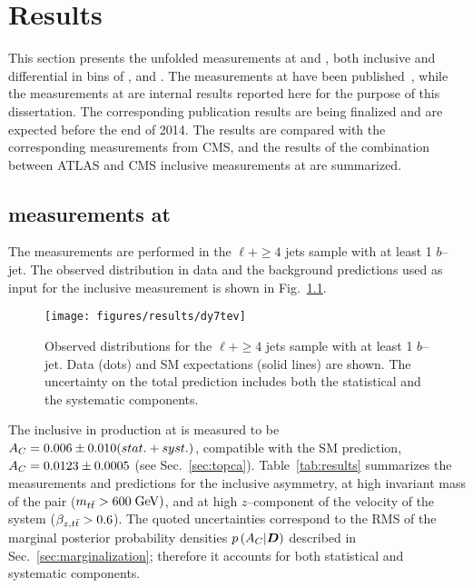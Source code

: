 \chapter{Results}
\label{sec:results}

This section presents the unfolded \ac{} measurements at \seventev{}
and \eighttev{}, both inclusive and differential in bins of \mtt{},
\pttt{} and \ytt{}. The measurements at \seventev{} have been
published~\cite{Aad:2013cea}, while the measurements at \eighttev{}
are internal results reported here for the purpose of this
dissertation. The corresponding publication results are being
finalized and are expected before the end of 2014. The results are
compared with the corresponding measurements from CMS, and the
results of the combination between ATLAS and CMS inclusive
measurements at \seventev{} are summarized.

\section{\ac{} measurements at \seventev{}}
\label{sec:res7tev}

The measurements are performed in the $\ell{}+\ge4$ jets sample with
at least 1 $b$--jet. The observed \dy{} distribution in data and the
background predictions used as input for the inclusive measurement is
shown in Fig.~\ref{fig:dy7tev}.

\begin{figure}[!htb]\centering
  \texttt{[image: figures/results/dy7tev]} 
  \caption{Observed \dy{} distributions for the $\ell{}+\ge4$ jets
    sample with at least 1 $b$--jet. Data (dots) and SM expectations
    (solid lines) are shown. The uncertainty on the total prediction
    includes both the statistical and the systematic components.}
  \label{fig:dy7tev}
\end{figure}

The inclusive \ac{} in \ttbar{} production at \seventev{} is measured to be
$A_C{}= 0.006\pm0.010(stat.+syst.)$, compatible with the SM prediction,
$A_C{}=0.0123\pm0.0005$ (see Sec.~\ref{sec:topca}).
Table~\ref{tab:results} summarizes the
measurements and predictions for the inclusive asymmetry, at high
invariant mass of the \ttbar{} pair ($m_{t\bar{t}}{} >600 \; \mathrm{GeV}{})$, and at
high $z$--component of the velocity of the \ttbar{} system ($\beta_{z,t\bar{t}}{}>0.6$).
The quoted uncertainties correspond to the RMS of the marginal posterior
probability densities $p\left(A_C{}|\boldsymbol{D}{}\right)$ described in
Sec.~\ref{sec:marginalization}; therefore it accounts for both
statistical and systematic components.

